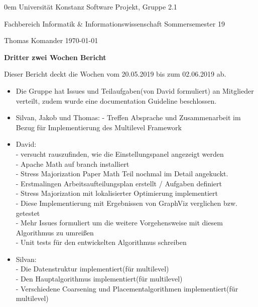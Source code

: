 \documentclass[]{article}
\date{}
\begin{document}
	
	{\footnotesize \parindent0em
		{\sc Universität Konstanz} \hfill {\sc Software Projekt, Gruppe 2.1}\par
		{\sc Fachbereich Informatik \& Informationswissenschaft} \hfill Sommersemester 19 \par
		Thomas Komander \hfill \today\par
		\bigskip
		\begin{center}
			{\LARGE\bf Dritter zwei Wochen Bericht}
			\bigskip
		\end{center}
	}
	
	Dieser Bericht deckt die Wochen vom 20.05.2019 bis zum 02.06.2019 ab. \\
	
	\begin{itemize}
		
		\item Die Gruppe hat Issues und Teilaufgaben(von David formuliert) an Mitglieder verteilt, zudem wurde eine documentation Guideline beschlossen.
		
		\item Silvan, Jakob und Thomas:
		- Treffen Absprache und Zusammenarbeit im Bezug für Implementierung des Multilevel Framework
		
		\item  David: \\
		- versucht rauszufinden, wie die Einstellungspanel angezeigt werden\\
		- Apache Math auf branch installiert\\
		- Stress Majorization Paper Math Teil nochmal im Detail angekuckt.\\
		- Erstmalingen Arbeitsaufteilungsplan erstellt / Aufgaben definiert\\
		- Stress Majorization mit lokalisierter Optimierung implementiert\\
		- Diese Implementierung mit Ergebnissen von GraphViz verglichen bzw. getestet\\
		- Mehr Issues formuliert um die weitere Vorgehensweise mit diesem Algorithmus zu umreißen\\
		- Unit tests für den entwickelten Algorithmus schreiben
		
		\item Silvan: \\
		- Die Datenstruktur implementiert(für multilevel)\\
		- Den Hauptalgorithmus implementiert(für multilevel)\\
		- Verschiedene Coarsening und Placementalgorithmen implementiert(für multilevel)
		

\end{itemize}
\end{document}
